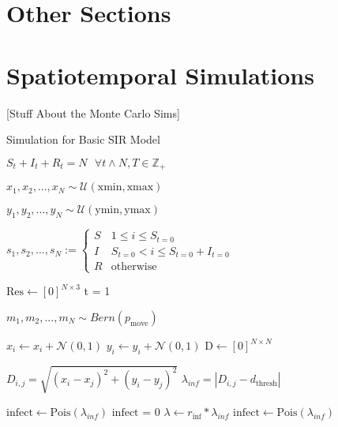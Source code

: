 \documentclass[a4paper]{article}
\begin{document}
\section{Other Sections}

\section{Spatiotemporal Simulations}

[Stuff About the Monte Carlo Sims]


\begin{algorithm}
\caption{Simulation for Basic SIR Model}
\begin{algorithmic} 
\REQUIRE $S_{t} + I_{t} + R_{t} = N \text{   } \forall t \wedge N,T \in \mathbb{Z}_{+}$

\STATE $x_{1}, x_{2}, ..., x_{N} \sim \mathcal{U}(\text{xmin}, \text{xmax})$

\STATE $y_{1}, y_{2}, ..., y_{N} \sim \mathcal{U}(\text{ymin}, \text{ymax})$

\STATE $s_{1}, s_{2}, ..., s_{N} := \begin{cases} S & 1 \leq i \leq S_{t=0} \\ I & S_{t=0} < i \leq S_{t=0} + I_{t=0} \\ R & \text{otherwise}  \end{cases}$

\STATE $\text{Res} \leftarrow [0]^{N \times 3}$
\STATE t = 1

\STATE $m_{1}, m_{2}, ..., m_{N} \sim \textit{Bern}(p_{\text{move}})$

\STATE $x_{i} \leftarrow x_{i} + \mathcal{N}(0,1)$
\STATE $y_{i} \leftarrow y_{i} + \mathcal{N}(0,1)$
\ENDIF
\ENDFOR
\STATE $\text{D} \leftarrow [0]^{N \times N}$

\STATE $D_{i,j} = \sqrt{(x_{i} - x_{j})^{2} + (y_{i} - y_{j})^{2}}$
\ENDFOR
\ENDFOR
{}
\STATE $\lambda_{inf} = |D_{i,j} - d_{\text{thresh}}|$
\ENDIF

\STATE $\text{infect} \leftarrow \text{Pois}(\lambda_{inf})$
\STATE $\text{infect = 0}$
\STATE $\lambda \leftarrow r_{\text{inf}} * \lambda_{inf}$
\STATE $\text{infect} \leftarrow \text{Pois}(\lambda_{inf})$
\ENDIF


\end{algorithmic}
\end{algorithm}
\end{document}
